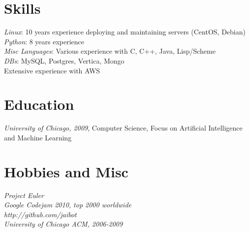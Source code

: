 \documentclass[11pt]{res} %
\begin{document}
\begin{resume}
\section{Skills}
{\sl Linux}: 10 years experience deploying and maintaining servers (CentOS, Debian)\\
{\sl Python}: 8 years experience \\
{\sl Misc Languages}: Various experience with C, C++, Java, Lisp/Scheme \\
{\sl DBs}: MySQL, Postgres, Vertica, Mongo \\
Extensive experience with AWS


\section{Education}

{\sl University of Chicago, 2009}, Computer Science, Focus on Artificial Intelligence and Machine Learning
 

\section{Hobbies and Misc} 

{\it Project Euler} \\
{\it Google Codejam 2010, top 2000 worldwide} \\
{\it http://github.com/jaibot } \\
{\it University of Chicago ACM, 2006-2009} \\



\end{resume}
\end{document}
